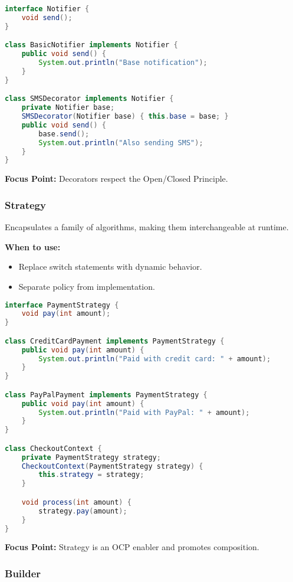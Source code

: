 \documentclass[a4paper,12pt]{article}
\begin{document}
\begin{lstlisting}[language=Java]
interface Notifier {
    void send();
}

class BasicNotifier implements Notifier {
    public void send() {
        System.out.println("Base notification");
    }
}

class SMSDecorator implements Notifier {
    private Notifier base;
    SMSDecorator(Notifier base) { this.base = base; }
    public void send() {
        base.send();
        System.out.println("Also sending SMS");
    }
}
\end{lstlisting}

\textbf{Focus Point:} Decorators respect the Open/Closed Principle.

\subsubsection{Strategy}

Encapsulates a family of algorithms, making them interchangeable at runtime.

\textbf{When to use:}
\begin{itemize}
  \item Replace switch statements with dynamic behavior.
  \item Separate policy from implementation.
\end{itemize}

\begin{lstlisting}[language=Java]
interface PaymentStrategy {
    void pay(int amount);
}

class CreditCardPayment implements PaymentStrategy {
    public void pay(int amount) {
        System.out.println("Paid with credit card: " + amount);
    }
}

class PayPalPayment implements PaymentStrategy {
    public void pay(int amount) {
        System.out.println("Paid with PayPal: " + amount);
    }
}

class CheckoutContext {
    private PaymentStrategy strategy;
    CheckoutContext(PaymentStrategy strategy) {
        this.strategy = strategy;
    }

    void process(int amount) {
        strategy.pay(amount);
    }
}
\end{lstlisting}

\textbf{Focus Point:} Strategy is an OCP enabler and promotes composition.

\subsubsection{Builder}
\end{document}
